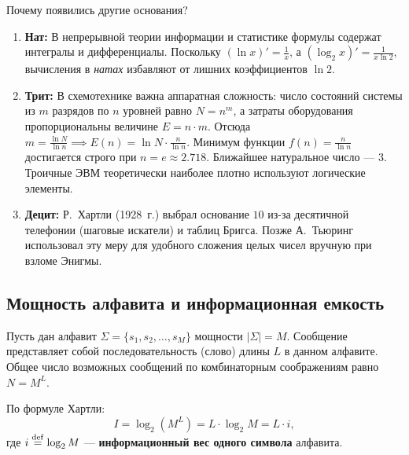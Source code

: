 \documentclass[11pt,a4paper]{article}
\begin{document}
\begin{infobox}{Почему появились другие основания?}
\begin{enumerate}
    \item \textbf{Нат:} В непрерывной теории информации и статистике формулы содержат интегралы и дифференциалы. Поскольку $(\ln x)' = \frac{1}{x}$, а $(\log_2 x)' = \frac{1}{x \ln 2}$, вычисления в \textit{натах} избавляют от лишних коэффициентов $\ln 2$.
    \item \textbf{Трит:} В схемотехнике важна аппаратная сложность: число состояний системы из $m$ разрядов по $n$ уровней равно $N = n^m$, а затраты оборудования пропорциональны величине $E = n \cdot m$. Отсюда $m = \frac{\ln N}{\ln n} \implies E(n) = \ln N \cdot \frac{n}{\ln n}$. Минимум функции $f(n) = \frac{n}{\ln n}$ достигается строго при $n = e \approx 2.718$. Ближайшее натуральное число --- $3$. Троичные ЭВМ теоретически наиболее плотно используют логические элементы.
    \item \textbf{Децит:} Р.~Хартли (1928~г.) выбрал основание $10$ из-за десятичной телефонии (шаговые искатели) и таблиц Бригса. Позже А.~Тьюринг использовал эту меру для удобного сложения целых чисел вручную при взломе \guillemotleft Энигмы\guillemotright.
\end{enumerate}
\end{infobox}

\subsection{Мощность алфавита и информационная емкость}
Пусть дан алфавит $\Sigma = \{s_1, s_2, \dots, s_M\}$ мощности $|\Sigma| = M$. Сообщение представляет собой последовательность (слово) длины $L$ в данном алфавите. Общее число возможных сообщений по комбинаторным соображениям равно $N = M^L$.

По формуле Хартли:
$$I = \log_2 (M^L) = L \cdot \log_2 M = L \cdot i,$$
где $i \overset{\mathrm{def}}{=} \log_2 M$ --- \textbf{информационный вес одного символа} алфавита.
\end{document}
